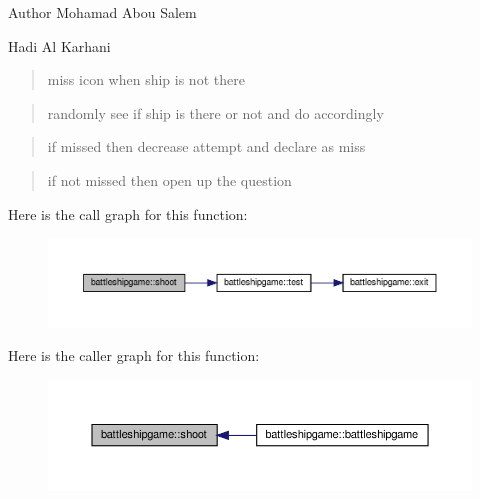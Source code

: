 \begin{DoxyAuthor}{Author}
Mohamad Abou Salem 

Hadi Al Karhani 
\end{DoxyAuthor}
\begin{quote}
miss icon when ship is not there \end{quote}


\begin{quote}
randomly see if ship is there or not and do accordingly \end{quote}


\begin{quote}
if missed then decrease attempt and declare as miss \end{quote}


\begin{quote}
if not missed then open up the question \end{quote}
Here is the call graph for this function\+:
\nopagebreak
\begin{figure}[H]
\begin{center}
\leavevmode
\includegraphics[width=350pt]{classbattleshipgame_aa5a079217b1de092692515bc8fda0443_cgraph}
\end{center}
\end{figure}
Here is the caller graph for this function\+:
\nopagebreak
\begin{figure}[H]
\begin{center}
\leavevmode
\includegraphics[width=350pt]{classbattleshipgame_aa5a079217b1de092692515bc8fda0443_icgraph}
\end{center}
\end{figure}
\mbox{\label{classbattleshipgame_a573cf39fd3700ffd3a79587437d66d37}} 
